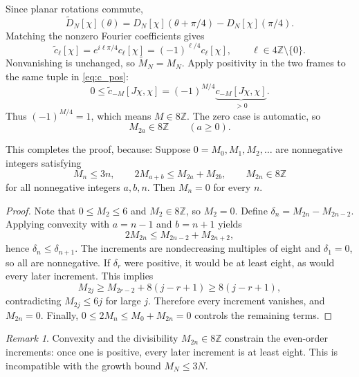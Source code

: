 \documentclass[11pt, letterpaper, reqno]{amsart}
\theoremstyle{definition}
\newenvironment{lemma}
{\pushQED{\qed}\renewcommand{\qedsymbol}{$\blacksquare$}\lemmax}
{\popQED\endlemmax}
\theoremstyle{remark}
\newtheorem*{remark*}{Remark}
\newcommand{\bbZ}{\mathbb{Z}}
\begin{document}
Since planar rotations commute,
\begin{equation}
 \tilde D_N[\chi](\theta)
       =D_N[\chi](\theta+\pi/4)-D_N[\chi](\pi/4).
\end{equation}
Matching the nonzero Fourier coefficients gives
\begin{equation}\label{eq:tilt-coefficient}
 \tilde c_\ell[\chi]=e^{i\ell\pi/4}c_\ell[\chi]
                  =(-1)^{\ell/4}c_\ell[\chi],
 \qquad\ell\in4\bbZ\setminus\{0\}.
\end{equation}
Nonvanishing is unchanged, so $\tilde M_N=M_N$.
Apply positivity in the two frames to the same tuple in
\eqref{eq:c_pos}:
\begin{equation}
 0\leq\tilde c_{-M}[J\chi,\chi]
     =(-1)^{M/4}\underbrace{c_{-M}[J\chi,\chi]}_{>0}.
\end{equation}
Thus $(-1)^{M/4}=1$, which means $M\in8\bbZ$.
The zero case is automatic, so
\begin{equation}\label{eq:8}
 M_{2a}\in8\bbZ\qquad(a\geq0).
\end{equation}

This completes the proof, because:
\begin{lemma}\label{lem:integer}
Suppose $0=M_0,M_1,M_2,\dots$ are nonnegative integers satisfying
\begin{equation}
 M_n\leq3n,\qquad2M_{a+b}\leq M_{2a}+M_{2b},\qquad
 M_{2n}\in8\bbZ
\end{equation}
for all nonnegative integers $a,b,n$. Then $M_n=0$ for every $n$.
\end{lemma}
\begin{proof}
Note that $0\leq M_2\leq6$ and $M_2\in8\bbZ$, so $M_2=0$.
Define $\delta_n=M_{2n}-M_{2n-2}$. Applying convexity with
$a=n-1$ and $b=n+1$ yields
\begin{equation}
 2M_{2n}\leq M_{2n-2}+M_{2n+2},
\end{equation}
hence $\delta_n\leq\delta_{n+1}$. The increments are nondecreasing
multiples of eight and $\delta_1=0$, so all are nonnegative. If
$\delta_r$ were positive, it would be at least eight, as would every
later increment. This implies
\begin{equation}
 M_{2j}\geq M_{2r-2}+8(j-r+1)\geq8(j-r+1),
\end{equation}
contradicting $M_{2j}\leq6j$ for large $j$. Therefore every increment
vanishes, and $M_{2n}=0$. Finally,
$0\leq2M_n\leq M_0+M_{2n}=0$ controls the remaining terms.
\end{proof}

\begin{remark*}
Convexity and the divisibility $M_{2n}\in8\bbZ$ constrain the
even-order increments: once one is positive, every later increment
is at least eight. This is incompatible with the growth bound
$M_N\leq3N$.
\end{remark*}
\end{document}
